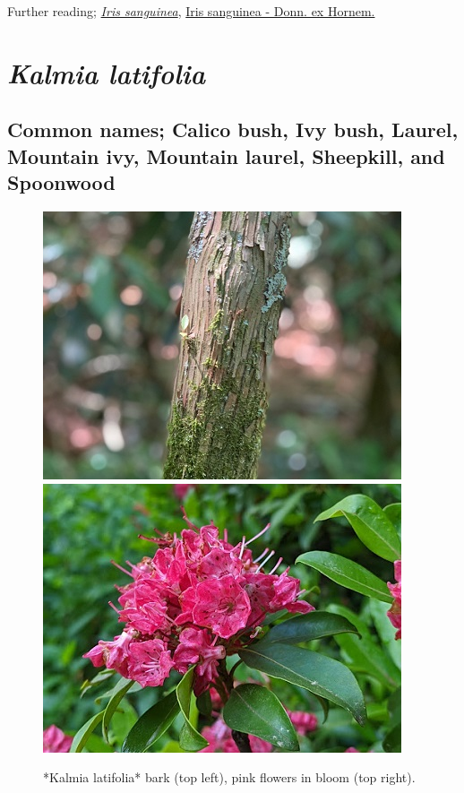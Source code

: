 \documentclass[
]{article}
\begin{document}
Further reading; \href{https://plants.ces.ncsu.edu/plants/iris-sanguinea/}{\emph{Iris sanguinea}},
\href{https://pfaf.org/user/Plant.aspx?LatinName=Iris+sanguinea}{Iris sanguinea - Donn. ex Hornem.}

\hypertarget{kalmia-latifolia}{%
\section{\texorpdfstring{\emph{Kalmia latifolia}}{Kalmia latifolia}}\label{kalmia-latifolia}}

\hypertarget{common-names-calico-bush-ivy-bush-laurel-mountain-ivy-mountain-laurel-sheepkill-and-spoonwood}{%
\subsection{Common names; Calico bush, Ivy bush, Laurel, Mountain ivy, Mountain laurel, Sheepkill, and Spoonwood}\label{common-names-calico-bush-ivy-bush-laurel-mountain-ivy-mountain-laurel-sheepkill-and-spoonwood}}

\begin{figure}

{\centering \includegraphics[width=0.5\linewidth]{kalmia1} \includegraphics[width=0.5\linewidth]{kalmlat} 

}

\caption{*Kalmia latifolia* bark (top left), pink flowers in bloom (top right).}\label{fig:kalmia}
\end{figure}
\end{document}
